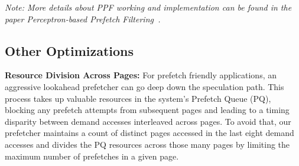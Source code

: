 \textit {Note: More details about PPF working and implementation can
  be found in the paper Perceptron-based Prefetch
  Filtering~\cite{EshanISCA2019}.}

\subsection{Other Optimizations}
\label{Enhancements-Misc}

\noindent \textbf{Resource Division Across Pages:} For prefetch
friendly applications, an aggressive lookahead prefetcher can go deep
down the speculation path. This process takes up valuable resources in
the system's Prefetch Queue (PQ), blocking any prefetch attempts from
subsequent pages and leading to a timing disparity between demand
accesses interleaved across pages. To avoid that, our prefetcher
maintains a count of distinct pages accessed in the last eight demand
accesses and divides the PQ resources across those many pages by
limiting the maximum number of prefetches in a given page.
